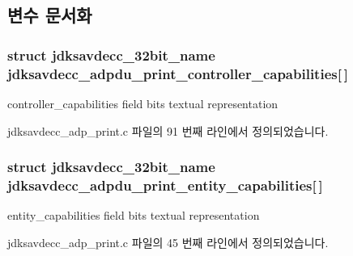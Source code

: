 \subsection{변수 문서화}
\subsubsection[{\texorpdfstring{jdksavdecc\+\_\+adpdu\+\_\+print\+\_\+controller\+\_\+capabilities}{jdksavdecc_adpdu_print_controller_capabilities}}]{\setlength{\rightskip}{0pt plus 5cm}struct {\bf jdksavdecc\+\_\+32bit\+\_\+name} jdksavdecc\+\_\+adpdu\+\_\+print\+\_\+controller\+\_\+capabilities\mbox{[}$\,$\mbox{]}}\hypertarget{group__adp__print_ga338d7b70fd9a2b2177827cab7867c279}{}\label{group__adp__print_ga338d7b70fd9a2b2177827cab7867c279}


controller\+\_\+capabilities field bits textual representation 



jdksavdecc\+\_\+adp\+\_\+print.\+c 파일의 91 번째 라인에서 정의되었습니다.

\subsubsection[{\texorpdfstring{jdksavdecc\+\_\+adpdu\+\_\+print\+\_\+entity\+\_\+capabilities}{jdksavdecc_adpdu_print_entity_capabilities}}]{\setlength{\rightskip}{0pt plus 5cm}struct {\bf jdksavdecc\+\_\+32bit\+\_\+name} jdksavdecc\+\_\+adpdu\+\_\+print\+\_\+entity\+\_\+capabilities\mbox{[}$\,$\mbox{]}}\hypertarget{group__adp__print_ga7983dab1767e3e1cbdf1c8871ffc93b3}{}\label{group__adp__print_ga7983dab1767e3e1cbdf1c8871ffc93b3}


entity\+\_\+capabilities field bits textual representation 



jdksavdecc\+\_\+adp\+\_\+print.\+c 파일의 45 번째 라인에서 정의되었습니다.

